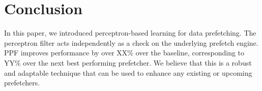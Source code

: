 \section{Conclusion}
\label{Conclusion}
In this paper, we introduced perceptron-based learning for data prefetching.
The perceptron filter acts independently as a check on the underlying prefetch
engine.  PPF improves performance by over XX\% over the baseline,
corresponding to YY\% over the next best performing prefetcher.  We believe
that this is a robust and adaptable technique that can be used to enhance any
existing or upcoming prefetchers.
